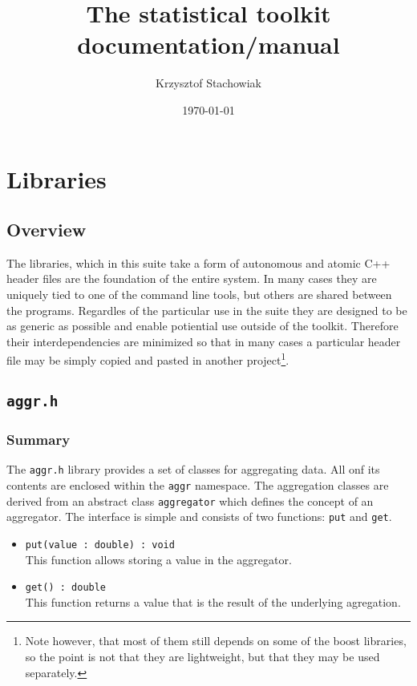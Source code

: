 \documentclass{report}
\begin{document}
\title{The statistical toolkit documentation/manual}
\author{Krzysztof Stachowiak}
\date{\today}

\maketitle

\tableofcontents

\chapter{Libraries}

\section{Overview}
The libraries, which in this suite take a form of autonomous and atomic C++
header files are the foundation of the entire system. In many cases they are
uniquely tied to one of the command line tools, but others are shared between
the programs. Regardles of the particular use in the suite they are designed to
be as generic as possible and enable potiential use outside of the toolkit.
Therefore their interdependencies are minimized so that in many cases a
particular header file may be simply copied and pasted in another
project\footnote{Note however, that most of them still depends on some of the boost
libraries, so the point is not that they are lightweight, but that they may be
used separately.}.

\section{\texttt{aggr.h}}

\subsection{Summary}
The \texttt{aggr.h} library provides a set of classes for aggregating data.
All onf its contents are enclosed within the \texttt{aggr} namespace. The
aggregation classes are derived from an abstract class \texttt{aggregator}
which defines the concept of an aggregator. The interface is simple and
consists of two functions: \texttt{put} and \texttt{get}.

\begin{itemize}
	\item \texttt{put(value : double) : void}\\
		This function allows storing a value in the aggregator.
	\item \texttt{get() : double}\\
		This function returns a value that is the result of the
		underlying agregation.
\end{itemize}
\end{document}
